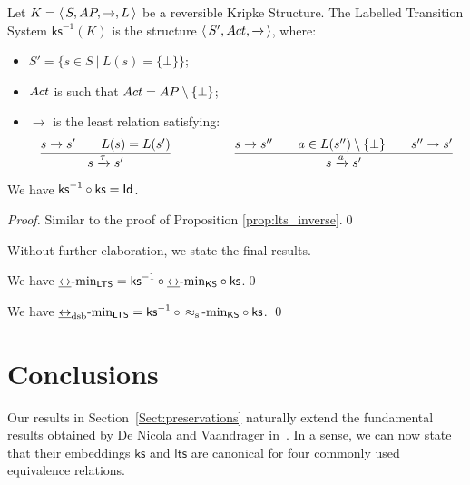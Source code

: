 \documentclass{llncs}
\newcommand{\sosrule}[2]{\frac{\raisebox{.7ex}{\normalsize{$#1$}}}
                        {\raisebox{-1.0ex}{\normalsize{$#2$}}}}
\newcommand{\ltstrans}[1]{\xrightarrow{#1}}
\newcommand{\kstrans}{\to}
\newcommand{\bisim}{\mbox{$\underline{\leftrightarrow}$}}
\newcommand{\dsbbisim}{\mbox{$\underline{\leftrightarrow}_{\mathrm{dsb}}$}}
\newcommand{\stuttering}{\,\approx_{\mathrm{s}}\,}
\newcommand{\lts}{\mathsf{lts}}
\newcommand{\ks}{\mathsf{ks}}
\newcommand{\ksrev}{\ks^{-1}}
\begin{document}
\begin{definition}
Let $K = \tuple{S, \AP, \kstrans, L}$ be a reversible Kripke Structure.
The Labelled Transition System $\ksrev(K)$ is the structure
$\tuple{S', \act, \ltstrans{}}$, where:
\begin{itemize}
\item $S' = \{s \in S ~|~ L(s) = \{\bot\} \}$;

\item $Act$ is such that $Act = AP \setminus \{\bot\}$;

\item $\ltstrans{}$ is the least relation satisfying:
$$
\begin{array}{cp{1cm}c}
\sosrule{s \kstrans s' \qquad L(s) = L(s')}
        {s \ltstrans{\tau} s'}
& &
\sosrule{s \kstrans s'' \qquad a \in L(s'')\setminus \{\bot\} \qquad s'' \kstrans s'}
        {s \ltstrans{a} s'}
\end{array}
$$

\end{itemize}
\end{definition}
\begin{proposition}
\label{prop:ks_inverse}
We have $\ksrev \circ \ks = \id$.
\end{proposition}

\begin{proof}
Similar to the proof of Proposition \ref{prop:lts_inverse}.\qed
\end{proof}

\noindent
Without further elaboration, we state the final results.
\begin{theorem}
\label{th:lts2ks_bisim_minimal}
We have $\minLTS{\bisim} = \ksrev \circ \minKS{\bisim} \circ \ks$.\qed
\end{theorem}



\begin{theorem}
\label{th:lts2ks_stut_minimal}
We have $\minLTS{\dsbbisim} = \ksrev \circ \minKS{\stuttering} \circ \ks$.
\qed
\end{theorem}



\section{Conclusions}\label{Sect::conc}

Our results in Section~\ref{Sect:preservations} naturally extend
the fundamental results obtained by De Nicola and Vaandrager
in~\cite{DBLP:conf/litp/NicolaV90,DBLP:journals/jacm/NicolaV95}.
In a sense, we can now state that their embeddings
$\ks$ and $\lts$ are canonical for four commonly used equivalence
relations.
\end{document}
